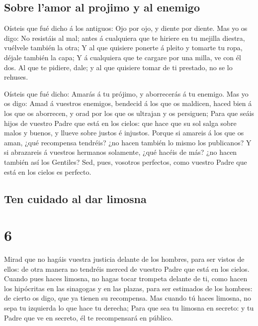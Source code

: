 \hypertarget{sobre-lamor-al-projimo-y-al-enemigo}{%
\subsection{Sobre l'amor al projimo y al
enemigo}\label{sobre-lamor-al-projimo-y-al-enemigo}}

 Oísteis que fué dicho á los antiguos: Ojo por ojo, y
diente por diente.  Mas yo os digo: No resistáis al mal;
antes á cualquiera que te hiriere en tu mejilla diestra, vuélvele
también la otra;  Y al que quisiere ponerte á pleito y
tomarte tu ropa, déjale también la capa;  Y á cualquiera
que te cargare por una milla, ve con él dos.  Al que te
pidiere, dale; y al que quisiere tomar de ti prestado, no se lo rehuses.

 Oísteis que fué dicho: Amarás á tu prójimo, y aborrecerás
á tu enemigo.  Mas yo os digo: Amad á vuestros enemigos,
bendecid á los que os maldicen, haced bien á los que os aborrecen, y
orad por los que os ultrajan y os persiguen;  Para que
seáis hijos de vuestro Padre que está en los cielos: que hace que su sol
salga sobre malos y buenos, y llueve sobre justos é injustos.
 Porque si amareis á los que os aman, ¿qué recompensa
tendréis? ¿no hacen también lo mismo los publicanos?  Y si
abrazareis á vuestros hermanos solamente, ¿qué hacéis de más? ¿no hacen
también así los Gentiles?  Sed, pues, vosotros perfectos,
como vuestro Padre que está en los cielos es perfecto.

\hypertarget{ten-cuidado-al-dar-limosna}{%
\subsection{Ten cuidado al dar
limosna}\label{ten-cuidado-al-dar-limosna}}

\hypertarget{section-5}{%
\section{6}\label{section-5}}

 Mirad que no hagáis vuestra justicia delante de los
hombres, para ser vistos de ellos: de otra manera no tendréis merced de
vuestro Padre que está en los cielos.  Cuando pues haces
limosna, no hagas tocar trompeta delante de ti, como hacen los
hipócritas en las sinagogas y en las plazas, para ser estimados de los
hombres: de cierto os digo, que ya tienen su recompensa. 
Mas cuando tú haces limosna, no sepa tu izquierda lo que hace tu
derecha;  Para que sea tu limosna en secreto: y tu Padre que
ve en secreto, él te recompensará en público.

